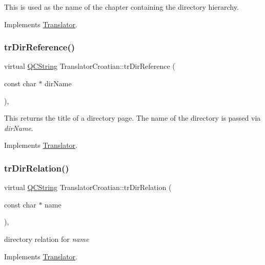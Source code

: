 This is used as the name of the chapter containing the directory hierarchy. 

Implements \mbox{\hyperlink{class_translator}{Translator}}.

\mbox{\label{class_translator_croatian_ace3893f9dddde8d1ccc27e7a286bd6b9}} 
\subsubsection{\texorpdfstring{trDirReference()}{trDirReference()}}
{\footnotesize\ttfamily virtual \mbox{\hyperlink{class_q_c_string}{Q\+C\+String}} Translator\+Croatian\+::tr\+Dir\+Reference (\begin{DoxyParamCaption}\item[{const char $\ast$}]{dir\+Name }\end{DoxyParamCaption})\hspace{0.3cm}{\ttfamily [inline]}, {\ttfamily [virtual]}}

This returns the title of a directory page. The name of the directory is passed via {\itshape dir\+Name}. 

Implements \mbox{\hyperlink{class_translator}{Translator}}.

\mbox{\label{class_translator_croatian_a79721807827d60578646eb4002723bda}} 
\subsubsection{\texorpdfstring{trDirRelation()}{trDirRelation()}}
{\footnotesize\ttfamily virtual \mbox{\hyperlink{class_q_c_string}{Q\+C\+String}} Translator\+Croatian\+::tr\+Dir\+Relation (\begin{DoxyParamCaption}\item[{const char $\ast$}]{name }\end{DoxyParamCaption})\hspace{0.3cm}{\ttfamily [inline]}, {\ttfamily [virtual]}}

directory relation for {\itshape name} 

Implements \mbox{\hyperlink{class_translator}{Translator}}.

